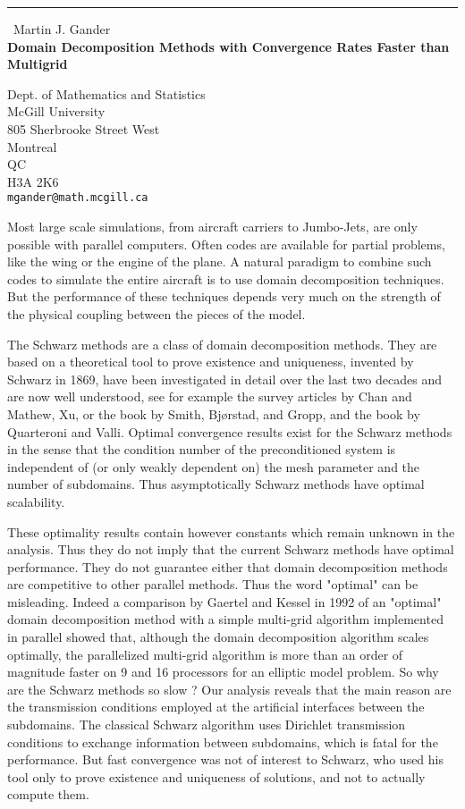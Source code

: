 \documentclass{report}
\begin{document}
\begin{center}
\rule{6in}{1pt} \
{\large Martin J. Gander \\
{\bf Domain Decomposition Methods with Convergence Rates Faster than Multigrid}}

Dept. of Mathematics and Statistics \\ McGill University \\ 805 Sherbrooke Street West \\ Montreal \\ QC \\ H3A 2K6
\\
{\tt mgander@math.mcgill.ca}\end{center}

Most large scale simulations, from aircraft carriers to Jumbo-Jets, are
only possible with parallel computers. Often codes are available for
partial problems, like the wing or the engine of the plane. A natural
paradigm to combine such codes to simulate the entire aircraft is to use
domain decomposition techniques. But the performance of these techniques
depends very much on the strength of the physical coupling between the
pieces of the model.

The Schwarz methods are a class of domain decomposition methods. They are
based on a theoretical tool to prove existence and uniqueness, invented
by Schwarz in 1869, have been investigated in detail over the last two
decades and are now well understood, see for example the survey articles
by Chan and Mathew, Xu, or the book by Smith, Bj{\o}rstad, and Gropp, and
the book by Quarteroni and Valli. Optimal convergence results exist for
the Schwarz methods in the sense that the condition number of the
preconditioned system is independent of (or only weakly dependent on) the
mesh parameter and the number of subdomains. Thus asymptotically Schwarz
methods have optimal scalability.

These optimality results contain however constants which remain unknown
in the analysis. Thus they do not imply that the current Schwarz methods
have optimal performance. They do not guarantee either that domain
decomposition methods are competitive to other parallel methods. Thus the
word "optimal" can be misleading. Indeed a comparison by Gaertel and
Kessel in 1992 of an "optimal" domain decomposition method with a simple
multi-grid algorithm implemented in parallel showed that, although the
domain decomposition algorithm scales optimally, the parallelized
multi-grid algorithm is more than an order of magnitude faster on 9 and
16 processors for an elliptic model problem. So why are the Schwarz
methods so slow ? Our analysis reveals that the main reason are the
transmission conditions employed at the artificial interfaces between the
subdomains. The classical Schwarz algorithm uses Dirichlet transmission
conditions to exchange information between subdomains, which is fatal for
the performance. But fast convergence was not of interest to Schwarz, who
used his tool only to prove existence and uniqueness of solutions, and
not to actually compute them.
\end{document}
